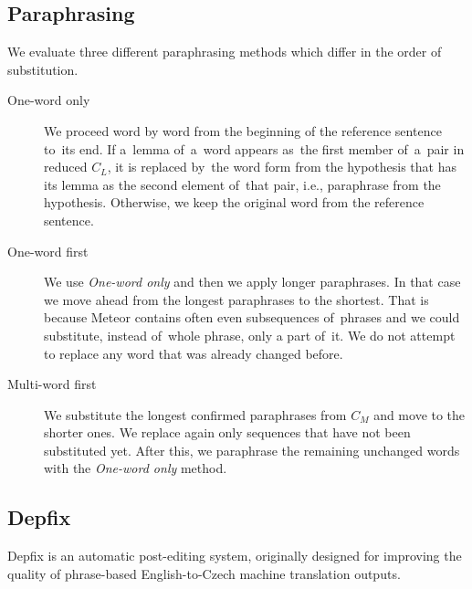 \subsection{Paraphrasing}
\label{paraphrasing}

We evaluate three different paraphrasing methods which differ in the order of
substitution.

\begin{description}
\item[One-word only] We proceed word by word from the beginning of the 
reference sentence to~its end. If a~lemma of~a~word appears as~the first member 
of~a~pair in reduced $ C_{L} $, it is replaced by~the word form from the 
hypothesis that has its lemma as the second element of~that pair, i.e., 
paraphrase from the hypothesis. Otherwise, we keep the original word from the 
reference sentence.
\item[One-word first] We use \textit{One-word only} and then we apply longer 
paraphrases. In that case we move ahead from the longest paraphrases to the 
shortest. That is because Meteor contains often even subsequences of~phrases 
and we could substitute, instead of~whole phrase, only a part of~it. We do not 
attempt to replace any word that was already changed before.
\item[Multi-word first] We substitute the longest confirmed paraphrases from
$ C_{M} $ and move to the shorter ones. We replace again only sequences that 
have not been substituted yet. After this, we paraphrase the remaining 
unchanged words with the \textit{One-word only} method.
\end{description}

\subsection{Depfix}
\label{depfix}
Depfix is an automatic post-editing system, originally designed for improving 
the quality of phrase-based English-to-Czech machine translation outputs.

